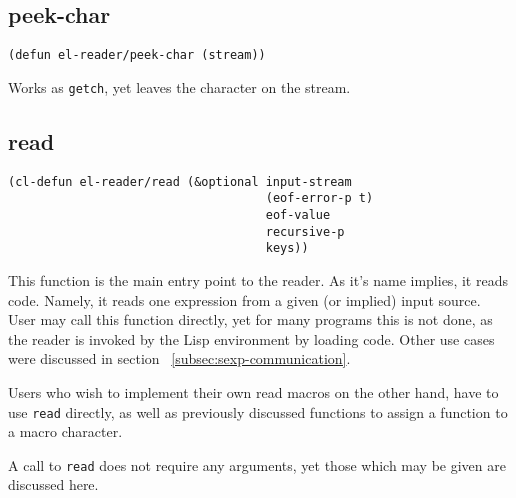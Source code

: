 \documentclass[a4paper,10pt,twoside]{report}
\newcommand{\fun}[1]{\texttt{#1}}
\newcommand{\Read}{\fun{read}}
\begin{document}
\subsection{peek-char}
\label{subsec:peek-char}

\begin{lstlisting}[style=lispinline]
(defun el-reader/peek-char (stream))
\end{lstlisting}

Works as \fun{getch}, yet leaves the character on the stream.

\subsection{read}
\label{subsec:read}

\begin{lstlisting}[style=lispinline]
(cl-defun el-reader/read (&optional input-stream
                                    (eof-error-p t)
                                    eof-value
                                    recursive-p
                                    keys))
\end{lstlisting}

This function is the main entry point to the reader.  As it’s name implies, it
reads code.  Namely, it reads one expression from a given (or implied) input
source.  User may call this function directly, yet for many programs this is not
done, as the reader is invoked by the Lisp environment by loading code.  Other
use cases were discussed in section ~\ref{subsec:sexp-communication}.

Users who wish to implement their own read macros on the other hand, have to use
\Read{} directly, as well as previously discussed functions to assign a function
to a macro character.

A call to \Read{} does not require any arguments, yet those which may be given
are discussed here.
\end{document}
